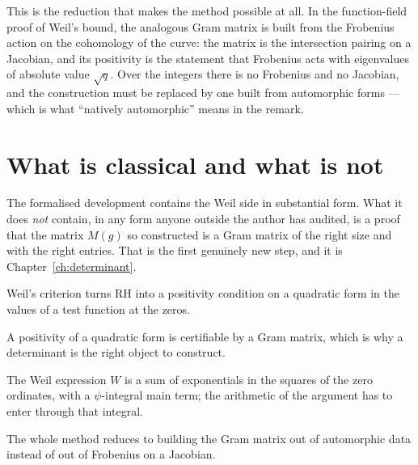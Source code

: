 This is the reduction that makes the method possible at all. In the
function-field proof of Weil's bound, the analogous Gram matrix is built from
the Frobenius action on the cohomology of the curve: the matrix is the
intersection pairing on a Jacobian, and its positivity is the statement that
Frobenius acts with eigenvalues of absolute value $\sqrt q$. Over the integers
there is no Frobenius and no Jacobian, and the construction must be replaced by
one built from automorphic forms --- which is what ``natively automorphic''
means in the remark.

\section{What is classical and what is not}The formalised development contains the Weil side in substantial form. What it
does \emph{not} contain, in any form anyone outside the author has audited, is
a proof that the matrix $M(g)$ so constructed is a Gram matrix of the right
size and with the right entries. That is the first genuinely new step, and it
is Chapter~\ref{ch:determinant}.

\begin{keytakeaways}
\item Weil's criterion turns RH into a positivity condition on a quadratic
form in the values of a test function at the zeros.
\item A positivity of a quadratic form is certifiable by a Gram matrix, which
is why a determinant is the right object to construct.
\item The Weil expression $W$ is a sum of exponentials in the squares of the
zero ordinates, with a $\psi$-integral main term; the arithmetic of the
argument has to enter through that integral.
\item The whole method reduces to building the Gram matrix out of automorphic
data instead of out of Frobenius on a Jacobian.
\end{keytakeaways}
